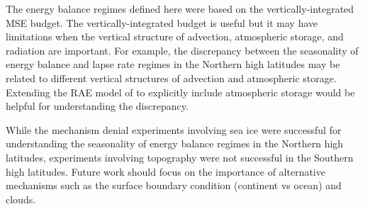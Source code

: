 \documentclass{ametsocV5}
\begin{document}
The energy balance regimes defined here were based on the vertically-integrated MSE budget. The vertically-integrated budget is useful but it may have limitations when the vertical structure of advection, atmospheric storage, and radiation are important. For example, the discrepancy between the seasonality of energy balance and lapse rate regimes in the Northern high latitudes may be related to different vertical structures of advection and atmospheric storage. Extending the RAE model of \cite{cronin2016} to explicitly include atmospheric storage would be helpful for understanding the discrepancy. 

While the mechanism denial experiments involving sea ice were successful for understanding the seasonality of energy balance regimes in the Northern high latitudes, experiments involving topography were not successful in the Southern high latitudes. Future work should focus on the importance of alternative mechanisms such as the surface boundary condition (continent vs ocean) and clouds.

\end{document}
